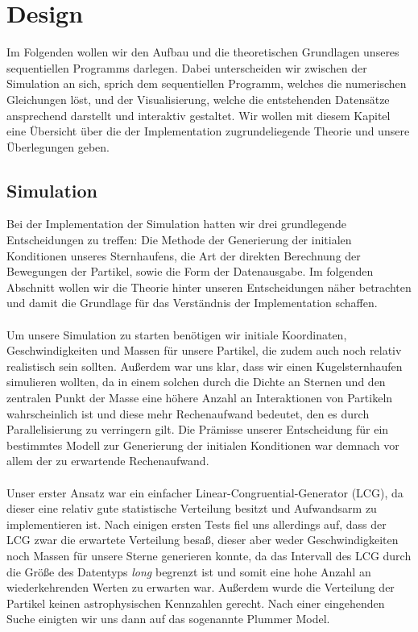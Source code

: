 \documentclass[
	12pt,
	a4paper,
	BCOR10mm,
	DIV14,
	headsepline,
	usegeometry,
]{scrreprt}
\begin{document}
\chapter{Design}
Im Folgenden wollen wir den Aufbau und die theoretischen Grundlagen unseres sequentiellen Programms darlegen. Dabei unterscheiden wir zwischen der Simulation an sich, sprich dem sequentiellen Programm, welches die numerischen Gleichungen löst, und der Visualisierung, welche die entstehenden Datensätze ansprechend darstellt und interaktiv gestaltet. Wir wollen mit diesem Kapitel eine Übersicht über die der Implementation zugrundeliegende Theorie und unsere Überlegungen geben.

\section{Simulation}
Bei der Implementation der Simulation hatten wir drei grundlegende Entscheidungen zu treffen: Die Methode der Generierung der initialen Konditionen unseres Sternhaufens, die Art der direkten Berechnung der Bewegungen der Partikel, sowie die Form der Datenausgabe. Im folgenden Abschnitt wollen wir die Theorie hinter unseren Entscheidungen näher betrachten und damit die Grundlage für das Verständnis der Implementation schaffen. \\\\ Um unsere Simulation zu starten benötigen wir initiale Koordinaten, Geschwindigkeiten und Massen für unsere Partikel, die zudem auch noch relativ realistisch sein sollten. Außerdem war uns klar, dass wir einen Kugelsternhaufen simulieren wollten, da in einem solchen durch die Dichte an Sternen und den zentralen Punkt der Masse eine höhere Anzahl an Interaktionen von Partikeln wahrscheinlich ist und diese mehr Rechenaufwand bedeutet, den es durch Parallelisierung zu verringern gilt. Die Prämisse unserer Entscheidung für ein bestimmtes Modell zur Generierung der initialen Konditionen war demnach vor allem der zu erwartende Rechenaufwand. \\\\ Unser erster Ansatz war ein einfacher Linear-Congruential-Generator (LCG), da dieser eine relativ gute statistische Verteilung besitzt und Aufwandsarm zu implementieren ist. Nach einigen ersten Tests fiel uns allerdings auf, dass der LCG zwar die erwartete Verteilung besaß, dieser aber weder Geschwindigkeiten noch Massen für unsere Sterne generieren konnte, da das Intervall des LCG durch die Größe des Datentyps \textit{long} begrenzt ist und somit eine hohe Anzahl an wiederkehrenden Werten zu erwarten war. Außerdem wurde die Verteilung der Partikel keinen astrophysischen Kennzahlen gerecht. Nach einer eingehenden Suche einigten wir uns dann auf das sogenannte Plummer Model.
\end{document}
